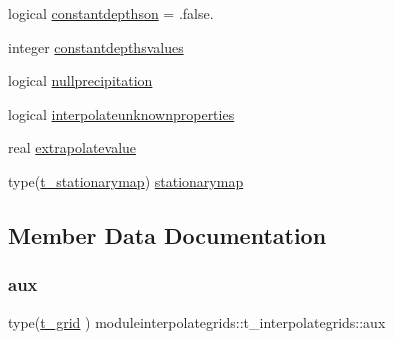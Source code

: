 \begin{DoxyCompactItemize}
\item 
logical \mbox{\hyperlink{structmoduleinterpolategrids_1_1t__interpolategrids_acf4040da67671e7d84fd9735fb565fac}{constantdepthson}} = .false.
\item 
integer \mbox{\hyperlink{structmoduleinterpolategrids_1_1t__interpolategrids_a46cf51887ecd7c0fc7e78c8bb8cdb586}{constantdepthsvalues}}
\item 
logical \mbox{\hyperlink{structmoduleinterpolategrids_1_1t__interpolategrids_a574c4a5749a911aefea6de5f9158c323}{nullprecipitation}}
\item 
logical \mbox{\hyperlink{structmoduleinterpolategrids_1_1t__interpolategrids_aabe68bc8f48a78612fa4b9ca41a97568}{interpolateunknownproperties}}
\item 
real \mbox{\hyperlink{structmoduleinterpolategrids_1_1t__interpolategrids_a06121c49b5ac28a59c36dd64faa55af7}{extrapolatevalue}}
\item 
type(\mbox{\hyperlink{structmoduleinterpolategrids_1_1t__stationarymap}{t\+\_\+stationarymap}}) \mbox{\hyperlink{structmoduleinterpolategrids_1_1t__interpolategrids_a05f5f011be91c6ee759fe7626373355d}{stationarymap}}
\end{DoxyCompactItemize}


\subsection{Member Data Documentation}
\mbox{\label{structmoduleinterpolategrids_1_1t__interpolategrids_ad2fa7829229ba4c24d69a0aaf6de41cc}} 
\subsubsection{\texorpdfstring{aux}{aux}}
{\footnotesize\ttfamily type(\mbox{\hyperlink{structmoduleinterpolategrids_1_1t__grid}{t\+\_\+grid}} ) moduleinterpolategrids\+::t\+\_\+interpolategrids\+::aux\hspace{0.3cm}{\ttfamily [private]}}

\mbox{\label{structmoduleinterpolategrids_1_1t__interpolategrids_aa492c6cf66397c353f8f572f4eba84f7}} 
